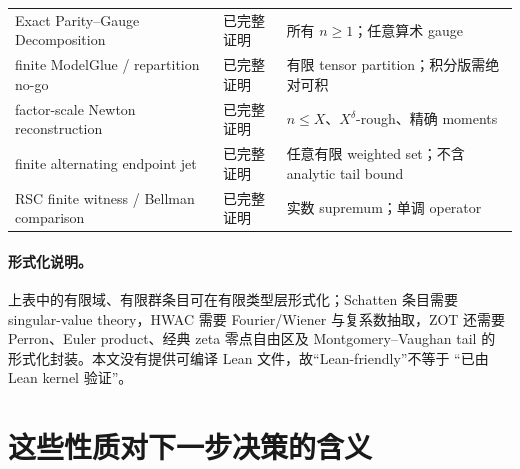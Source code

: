 \documentclass[11pt,a4paper]{ctexart}
\theoremstyle{definition}
\newcommand{\1}{\mathbf 1}
\begin{document}
\begin{center}
\begin{tabular}{p{}p{}p{}}
Exact Parity--Gauge Decomposition & 已完整证明 & 所有 $n\ge1$；任意算术 gauge\\
finite ModelGlue / repartition no-go & 已完整证明 & 有限 tensor partition；积分版需绝对可积\\
factor-scale Newton reconstruction & 已完整证明 & $n\le X$、$X^\delta$-rough、精确 moments\\
finite alternating endpoint jet & 已完整证明 & 任意有限 weighted set；不含 analytic tail bound\\
RSC finite witness / Bellman comparison & 已完整证明 & 实数 supremum；单调 operator\\
\bottomrule
\end{tabular}
\end{center}

\paragraph{形式化说明。}
上表中的有限域、有限群条目可在有限类型层形式化；Schatten 条目需要
singular-value theory，HWAC 需要 Fourier/Wiener 与复系数抽取，ZOT 还需要
Perron、Euler product、经典 zeta 零点自由区及 Montgomery--Vaughan tail 的
形式化封装。本文没有提供可编译 Lean 文件，故“Lean-friendly”不等于
“已由 Lean kernel 验证”。

\section{这些性质对下一步决策的含义}
\end{document}
